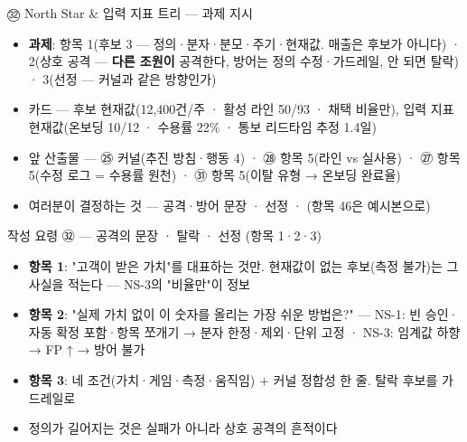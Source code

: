 \begin{frame}{㉜ North Star \& 입력 지표 트리 — 과제 지시}
\begin{itemize}
\item \textbf{과제}: 항목 1(후보 3 — 정의·분자·분모·주기·현재값. 매출은 후보가 아니다) · 2(상호 공격 — \textbf{다른 조원이} 공격한다, 방어는 정의 수정·가드레일, 안 되면 탈락) · 3(선정 — 커널과 같은 방향인가)
\item 카드 — 후보 현재값(12,400건/주 · 활성 라인 50/93 · 채택 비율만), 입력 지표 현재값(온보딩 10/12 · 수용률 22\% · 통보 리드타임 추정 1.4일)
\item 앞 산출물 — ㉕ 커널(추진 방침·행동 4) · ㉘ 항목 5(라인 vs 실사용) · ㉗ 항목 5(수정 로그 = 수용률 원천) · ㉛ 항목 5(이탈 유형 → 온보딩 완료율)
\item 여러분이 결정하는 것 — 공격·방어 문장 · 선정 · (항목 4\til{}6은 예시본으로)
\end{itemize}
\end{frame}

\begin{frame}{작성 요령 ㉜ — 공격의 문장 · 탈락 · 선정 (항목 1·2·3)}
\begin{itemize}
\item \textbf{항목 1}: "고객이 받은 가치"를 대표하는 것만. 현재값이 없는 후보(측정 불가)는 그 사실을 적는다 — NS-3의 "비율만"이 정보
\item \textbf{항목 2}: "실제 가치 없이 이 숫자를 올리는 가장 쉬운 방법은?" — NS-1: 빈 승인·자동 확정 포함·항목 쪼개기 → 분자 한정·제외·단위 고정 · NS-3: 임계값 하향 → FP ↑ → 방어 불가
\item \textbf{항목 3}: 네 조건(가치·게임·측정·움직임) + 커널 정합성 한 줄. 탈락 후보를 가드레일로
\item 정의가 길어지는 것은 실패가 아니라 상호 공격의 흔적이다
\end{itemize}
\end{frame}

